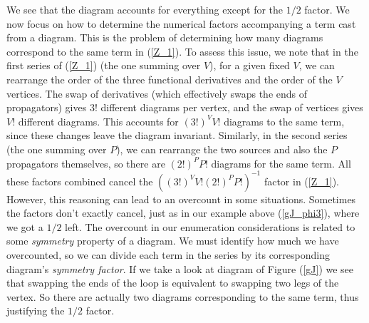 We see that the diagram accounts for everything except for the $1/2$ factor. We now focus on how to determine the numerical factors accompanying a term cast from a diagram. This is the problem of determining how many diagrams correspond to the same term in (\ref{Z_1}). To assess this issue, we note that in the first series of (\ref{Z_1}) (the one summing over $V$), for a given fixed $V$, we can rearrange the order of the three functional derivatives and the order of the $V$ vertices. The swap of derivatives (which effectively swaps the ends of propagators) gives $3!$ different diagrams per vertex, and the swap of vertices gives $V!$ different diagrams. This accounts for $(3!)^VV!$ diagrams to the same term, since these changes leave the diagram invariant. Similarly, in the second series (the one summing over $P$), we can rearrange the two sources and also the $P$ propagators themselves, so there are $(2!)^PP!$ diagrams for the same term. All these factors combined cancel the $((3!)^VV!(2!)^PP!)^{-1}$ factor in (\ref{Z_1}). \\

However, this reasoning can lead to an overcount in some situations. Sometimes the factors don't exactly cancel, just as in our example above (\ref{gJ_phi3}), where we got a $1/2$ left. The overcount in our enumeration considerations is related to some \textit{symmetry} property of a diagram.
We must identify how much we have overcounted, so we can divide each term in the series by its corresponding diagram's \textit{symmetry factor}.
If we take a look at diagram of Figure (\ref{gJ}) we see that swapping the ends of the loop is equivalent to swapping two legs of the vertex. So there are actually two diagrams corresponding to the same term, thus justifying the $1/2$ factor.\\

